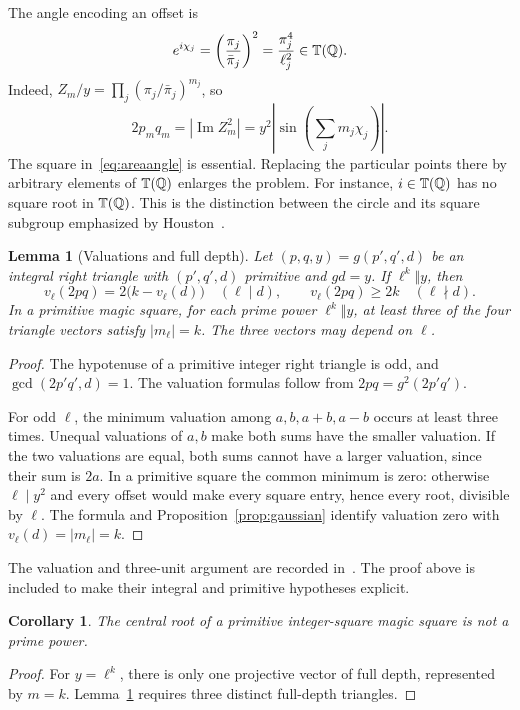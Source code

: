 \documentclass[11pt,letterpaper]{article}
\newtheorem{lemma}[theorem]{Lemma}
\newtheorem{corollary}[theorem]{Corollary}
\theoremstyle{definition}\newtheorem{definition}[theorem]{Definition}
\theoremstyle{remark}\newtheorem{remark}[theorem]{Remark}
\newcommand{\Q}{\mathbb Q}\newcommand{\Z}{\mathbb Z}\newcommand{\R}{\mathbb R}
\newcommand{\im}{\operatorname{Im}}\newcommand{\Res}{\operatorname{Res}}
\begin{document}
The angle encoding an offset is
\begin{equation}\label{eq:areaangle}
 e^{i\chi_j}=\left(\frac{\pi_j}{\bar\pi_j}\right)^2
             =\frac{\pi_j^4}{\ell_j^2}\in\T(\Q).
\end{equation}
Indeed, $Z_m/y=\prod_j(\pi_j/\bar\pi_j)^{m_j}$, so
\begin{equation}\label{eq:offset}
 2p_mq_m=|\im Z_m^2|
       =y^2\left|\sin\left(\sum_jm_j\chi_j\right)\right|.
\end{equation}
The square in~\eqref{eq:areaangle} is essential. Replacing the particular points there by arbitrary elements of $\T(\Q)$ enlarges the problem. For instance, $i\in\T(\Q)$ has no square root in $\T(\Q)$. This is the distinction between the circle and its square subgroup emphasized by Houston~\cite{Houston}.

\begin{lemma}[Valuations and full depth]\label{lem:depth}
Let $(p,q,y)=g(p',q',d)$ be an integral right triangle with $(p',q',d)$ primitive and $gd=y$. If $\ell^k\Vert y$, then
\[
 v_\ell(2pq)=2\bigl(k-v_\ell(d)\bigr)\quad(\ell\mid d),
 \qquad v_\ell(2pq)\ge2k\quad(\ell\nmid d).
\]
In a primitive magic square, for each prime power $\ell^k\Vert y$, at least three of the four triangle vectors satisfy $|m_\ell|=k$. The three vectors may depend on $\ell$.
\end{lemma}
\begin{proof}
The hypotenuse of a primitive integer right triangle is odd, and $\gcd(2p'q',d)=1$. The valuation formulas follow from $2pq=g^2(2p'q')$.

For odd $\ell$, the minimum valuation among $a,b,a+b,a-b$ occurs at least three times. Unequal valuations of $a,b$ make both sums have the smaller valuation. If the two valuations are equal, both sums cannot have a larger valuation, since their sum is $2a$. In a primitive square the common minimum is zero: otherwise $\ell\mid y^2$ and every offset would make every square entry, hence every root, divisible by $\ell$. The formula and Proposition~\ref{prop:gaussian} identify valuation zero with $v_\ell(d)=|m_\ell|=k$.
\end{proof}
The valuation and three-unit argument are recorded in~\cite[Sections 3--4]{MSSArchive}. The proof above is included to make their integral and primitive hypotheses explicit.

\begin{corollary}\label{cor:primepower}
The central root of a primitive integer-square magic square is not a prime power.
\end{corollary}
\begin{proof}
For $y=\ell^k$, there is only one projective vector of full depth, represented by $m=k$. Lemma~\ref{lem:depth} requires three distinct full-depth triangles.
\end{proof}
\end{document}
